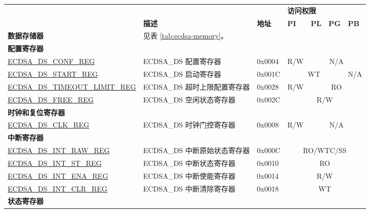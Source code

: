 \begin{small}
\begin{longtable}{ | p{5.2cm} | l | p{1.3cm} | l | l | l | l | }
\hline
\rowcolor{lightgray}
 &  &   & \multicolumn{4}{|l|}{\textbf{访问权限}} \\\cline{4-7}
\rowcolor{lightgray}
\multirow{-2}{*}{\textbf{名称}} & \multirow{-2}{*}{\textbf{描述}}  &  \multirow{-2}{*}{\textbf{地址}} & \textbf{PI} & \textbf{PL} & \textbf{PG} & \textbf{PB} \\ \hline
\endhead
\textbf{数据存储器} & \multicolumn{6}{|l|}{见表 \ref{tab:ecdsa-memory}。} \\ \hline
\multicolumn{7}{|l|}{\textbf{配置寄存器}} \\ \hline
\hyperref[regdesc:ECDSADSCONFREG]{ECDSA\_DS\_CONF\_REG} & ECDSA\_DS 配置寄存器 & 0x0004 & R/W & \multicolumn{3}{|c|}{N/A} \\ \hline
\hyperref[regdesc:ECDSADSSTARTREG]{ECDSA\_DS\_START\_REG} & ECDSA\_DS 启动寄存器 & 0x001C & \multicolumn{3}{|c|}{WT} & N/A \\ \hline
\hyperref[regdesc:ECDSADSTIMEOUTLIMITREG]{ECDSA\_DS\_TIMEOUT\_LIMIT\_REG} & ECDSA\_DS 超时上限配置寄存器 & 0x0028 & R/W & \multicolumn{3}{|c|}{RO}  \\ \hline
\hyperref[regdesc:ECDSADSFREEREG]{ECDSA\_DS\_FREE\_REG} & ECDSA\_DS 空闲状态寄存器 & 0x002C & \multicolumn{4}{|c|}{R/W} \\ \hline
\multicolumn{7}{|l|}{\textbf{时钟和复位寄存器}} \\ \hline
\hyperref[regdesc:ECDSADSCLKREG]{ECDSA\_DS\_CLK\_REG} & ECDSA\_DS 时钟门控寄存器 & 0x0008 & R/W & \multicolumn{3}{|c|}{N/A} \\ \hline
\multicolumn{7}{|l|}{\textbf{中断寄存器}} \\ \hline
\hyperref[regdesc:ECDSADSINTRAWREG]{ECDSA\_DS\_INT\_RAW\_REG} & ECDSA\_DS 中断原始状态寄存器 & 0x000C & \multicolumn{4}{|c|}{RO/WTC/SS} \\ \hline
\hyperref[regdesc:ECDSADSINTSTREG]{ECDSA\_DS\_INT\_ST\_REG} & ECDSA\_DS 中断状态寄存器 & 0x0010 & \multicolumn{4}{|c|}{RO} \\ \hline
\hyperref[regdesc:ECDSADSINTENAREG]{ECDSA\_DS\_INT\_ENA\_REG} & ECDSA\_DS 中断使能寄存器 & 0x0014 & \multicolumn{4}{|c|}{R/W} \\ \hline
\hyperref[regdesc:ECDSADSINTCLRREG]{ECDSA\_DS\_INT\_CLR\_REG} & ECDSA\_DS 中断清除寄存器 & 0x0018 & \multicolumn{4}{|c|}{WT} \\ \hline
\multicolumn{7}{|l|}{\textbf{状态寄存器}} \\ \hline

\end{longtable}
\end{small}

